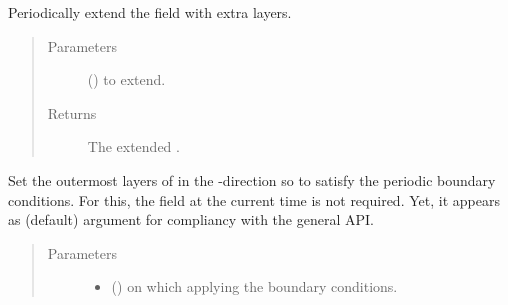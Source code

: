 \documentclass[letterpaper,10pt,english]{sphinxmanual}
\begin{document}
\begin{fulllineitems}
\begin{fulllineitems}
\begin{quote}
\begin{description}
\end{description}\end{quote}

\end{fulllineitems}


\begin{fulllineitems}
\label{\detokenize{api:dycore.horizontal_boundary.Periodic.from_physical_to_computational_domain}}
Periodically extend the field  with  extra layers.
\begin{quote}\begin{description}
\item[{Parameters}] \leavevmode
{} () \textendash{}  to extend.

\item[{Returns}] \leavevmode
The extended .

\end{description}\end{quote}

\end{fulllineitems}


\begin{fulllineitems}
\label{\detokenize{api:dycore.horizontal_boundary.Periodic.set_outermost_layers_x}}
Set the outermost layers of  in the -direction so to satisfy the periodic
boundary conditions. For this, the field  at the current time is not required. Yet,
it appears as (default) argument for compliancy with the general API.
\begin{quote}\begin{description}
\item[{Parameters}] \leavevmode\begin{itemize}
\item {} 
 () \textendash{}  on which applying the boundary conditions.


\end{itemize}
\end{description}
\end{quote}
\end{fulllineitems}
\end{fulllineitems}
\end{document}
